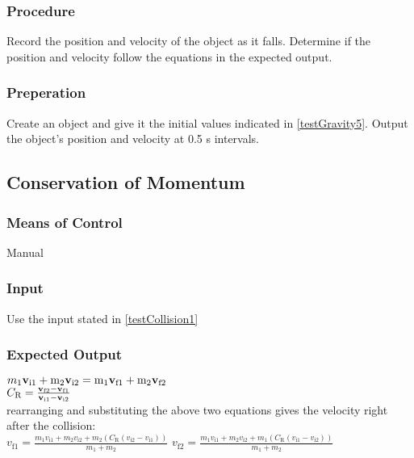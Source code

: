 \documentclass[12pt]{article}
\begin{document}
\subsubsection{Procedure}
Record the position and velocity of the object as it falls. Determine if the 
position and velocity follow the equations in the expected output.  

\subsubsection{Preperation}
Create an object and give it the initial values indicated in \ref{testGravity5}.
Output the object's position and velocity at 0.5 s intervals.



\subsection{Conservation of Momentum}
\subsubsection{Means of Control}
Manual
\subsubsection{Input}
Use the input stated in \ref{testCollision1}

\subsubsection{Expected Output}

$m_\text{1}\bf{v}_\text{i1} + \textnormal{m}_\text{2}\bf{v}_\text{i2}=\textnormal{m}_\text{1}\bf{v}_\text{f1} + \textnormal{m}_\text{2}\bf{v}_\text{f2}$\\
 $C_\text{R} = \bf \frac{v_\text{f2} - v_\text{f1}}{v_\text{i1} - v_\text{i2}}$\\

\noindent
rearranging and substituting the above two equations gives the velocity right after the collision:\\ 
$v_\text{f1} =  \frac{m_\text{1}v_\text{i1} + m_\text{2}v_\text{i2}  + m_\text{2}( C_\text{R}(v_\text{i2} -v_\text{i1}))}{m_\text{1} + m_\text{2}} $
$v_\text{f2} =  \frac{m_\text{1}v_\text{i1} + m_\text{2}v_\text{i2}  + m_\text{1}( C_\text{R}(v_\text{i1} -v_\text{i2}))}{m_\text{1} + m_\text{2}} $
 
\end{document}
